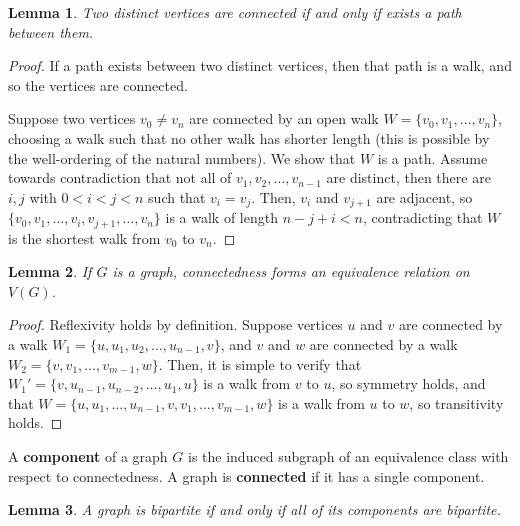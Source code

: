 \documentclass[a4paper,12pt]{article}
\newtheorem{lemma}{Lemma}
\begin{document}
\begin{lemma}
Two distinct vertices are connected if and only if exists a path between them.
\end{lemma}

\begin{proof}
If a path exists between two distinct vertices, then that path is a walk,
and so the vertices are connected.

Suppose two vertices $v_0 \neq v_n$ are connected by an open walk $W = \{v_0, v_1,
\dots, v_n\}$, choosing a walk such that no other walk has shorter length
(this is possible by the well-ordering of the natural numbers). We show that
$W$ is a path. Assume towards contradiction that not all of $v_1, v_2, \dots,
v_{n-1}$ are distinct, then there are $i,j$ with $0 < i < j < n$
such that $v_i = v_j$. Then, $v_i$ and $v_{j+1}$ are adjacent, so
$\{v_0, v_1, \dots, v_i, v_{j+1}, \dots, v_n\}$
is a walk of length $n - j + i < n$, contradicting that $W$ is the shortest
walk from $v_0$ to $v_n$.
\end{proof}

\begin{lemma}
If $G$ is a graph, connectedness forms an equivalence relation on $V(G)$.
\end{lemma}

\begin{proof}
Reflexivity holds by definition.
Suppose vertices $u$ and $v$ are connected by a walk
$W_1 = \{u, u_1, u_2, \dots, u_{n-1}, v\}$, and $v$ and $w$ are connected by a
walk $W_2 = \{v, v_1, \dots, v_{m-1}, w\}$. Then, it is simple to verify that
$W_1' = \{v, u_{n-1}, u_{n-2}, \dots, u_1, u\}$ is a walk from $v$ to $u$,
so symmetry holds, and that
$W = \{u, u_1, \dots, u_{n-1}, v, v_1, \dots, v_{m-1}, w\}$ is a walk from
$u$ to $w$, so transitivity holds.
\end{proof}

A {\bf component} of a graph $G$ is the induced subgraph of an equivalence class
with respect to connectedness. A graph is {\bf connected} if it has a single
component.

\begin{lemma}
A graph is bipartite if and only if all of its components are bipartite.
\end{lemma}
\end{document}
